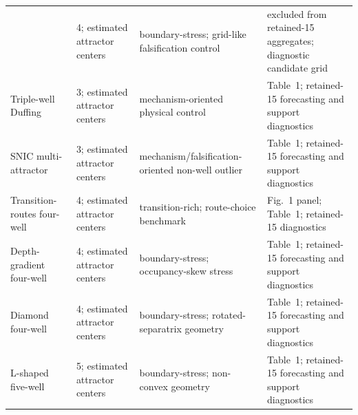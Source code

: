 \begin{table}[tbp]
{\begin{tabular}{@{}l l l l@{}}
  & 4; estimated attractor centers
  & boundary-stress; grid-like falsification control
  & excluded from retained-15 aggregates; diagnostic candidate grid \\
Triple-well Duffing
  & 3; estimated attractor centers
  & mechanism-oriented physical control
  & Table~1; retained-15 forecasting and support diagnostics \\
SNIC multi-attractor
  & 3; estimated attractor centers
  & mechanism/falsification-oriented non-well outlier
  & Table~1; retained-15 forecasting and support diagnostics \\
Transition-routes four-well
  & 4; estimated attractor centers
  & transition-rich; route-choice benchmark
  & Fig.~1 panel; Table~1; retained-15 diagnostics \\
Depth-gradient four-well
  & 4; estimated attractor centers
  & boundary-stress; occupancy-skew stress
  & Table~1; retained-15 forecasting and support diagnostics \\
Diamond four-well
  & 4; estimated attractor centers
  & boundary-stress; rotated-separatrix geometry
  & Table~1; retained-15 forecasting and support diagnostics \\
L-shaped five-well
  & 5; estimated attractor centers
  & boundary-stress; non-convex geometry
  & Table~1; retained-15 forecasting and support diagnostics \\
\bottomrule
\end{tabular}
}
\end{table}
